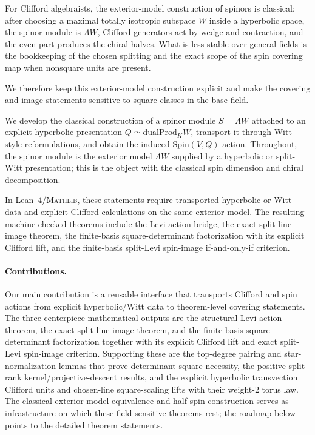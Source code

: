 \documentclass{birkjour}
\theoremstyle{plain}
\theoremstyle{definition}
\theoremstyle{remark}
\newcommand{\Spin}{\mathrm{Spin}}
\newcommand{\dualProd}{\mathrm{dualProd}}
\newcommand{\wedgeW}{\Lambda W}
\newcommand{\Lean}{Lean~4\xspace}
\newcommand{\Mathlib}{\textsc{Mathlib}\xspace}
\begin{document}
For Clifford algebraists, the exterior-model construction of spinors is
classical: after choosing a maximal totally isotropic subspace $W$ inside a
hyperbolic space, the spinor module is $\wedgeW$, Clifford generators act
by wedge and contraction, and the even part produces the chiral halves. What is
less stable over general fields is the bookkeeping of the chosen splitting and
the exact scope of the spin covering map when nonsquare units are present.

We therefore keep this exterior-model construction explicit and make the
covering and image statements sensitive to square classes in the base field.

We develop the classical construction of a spinor
module $S=\wedgeW$ attached to an explicit hyperbolic presentation
$Q \simeq \dualProd_K W$, transport it through Witt-style reformulations, and
obtain the induced $\Spin(V,Q)$-action. Throughout, the spinor module is the
exterior model $\wedgeW$ supplied by a hyperbolic or split-Witt presentation;
this is the object with the classical spin dimension and chiral decomposition.

In \Lean/\Mathlib, these statements require transported hyperbolic or Witt data
and explicit Clifford calculations on the same exterior model. The resulting
machine-checked theorems include the Levi-action bridge, the exact split-line
image theorem, the finite-basis square-determinant factorization with its
explicit Clifford lift, and the finite-basis split-Levi spin-image
if-and-only-if criterion.

\paragraph{Contributions.}
Our main contribution is a reusable interface that transports
Clifford and spin actions from explicit hyperbolic/Witt data to theorem-level
covering statements. The three centerpiece mathematical outputs are the
structural Levi-action theorem, the exact split-line image theorem, and the
finite-basis square-determinant factorization together with its explicit
Clifford lift and exact split-Levi spin-image criterion. Supporting these
are the top-degree pairing and star-normalization lemmas that prove
determinant-square necessity, the positive split-rank kernel/projective-descent
results, and the explicit hyperbolic transvection Clifford units and chosen-line
square-scaling lifts with their weight-$2$ torus law. The classical
exterior-model equivalence and half-spin construction serves as infrastructure on
which these field-sensitive theorems rest; the roadmap below points to the
detailed theorem statements.
\end{document}
